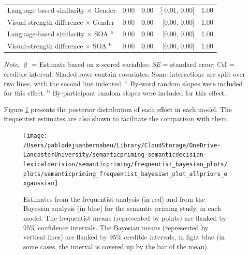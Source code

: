 \documentclass[
  12pt,
  man,floatsintext]{apa7}
\begin{document}
\begin{table}[H]
\begin{threeparttable}
\begin{tabular}[t]{lrrrr}
\hspace{1em}Language-based similarity  $\times$  Gender & 0.00 & 0.00 & {}[-0.01, 0.00] & 1.00\\
\hspace{1em}Visual-strength difference  $\times$  Gender & 0.00 & 0.00 & {}[0.00, 0.00] & 1.00\\
\hspace{1em}Language-based similarity  $\times$  SOA $^{\text{b}}$ & 0.00 & 0.00 & {}[0.00, 0.00] & 1.00\\
\hspace{1em}Visual-strength difference  $\times$  SOA $^{\text{b}}$ & 0.00 & 0.00 & {}[0.00, 0.00] & 1.00\\
\bottomrule
\end{tabular}
\begin{tablenotes}
\item \textit{\linebreak} 
\item \textit{Note}. $\upbeta$ = Estimate based on z-scored variables; \textit{SE} = standard error; \linebreak \phantom{.}CrI = credible interval. Shaded rows contain covariates. Some interactions \linebreak \phantom{.}are split over two lines, with the second line indented. \linebreak \linebreak \phantom{.}$^{\text{a}}$ By-word random slopes were included for this effect. \linebreak \phantom{.}$^{\text{b}}$ By-participant random slopes were included for this effect.
\end{tablenotes}
\end{threeparttable}
\end{table}

Figure \ref{fig:semanticpriming-frequentist-bayesian-plot-allpriors-exgaussian} presents the posterior distribution of each effect in each model. The frequentist estimates are also shown to facilitate the comparison with them.

\begin{figure}

{\centering \texttt{[image: /Users/pablodejuanbernabeu/Library/CloudStorage/OneDrive-LancasterUniversity/semanticpriming-semanticdecision-lexicaldecision/semanticpriming/frequentist\_bayesian\_plots/plots/semanticpriming\_frequentist\_bayesian\_plot\_allpriors\_exgaussian]} 

}

\caption{Estimates from the frequentist analysis (in red) and from the Bayesian analysis (in blue) for the semantic priming study, in each model. The frequentist means (represented by points) are flanked by 95\% confidence intervals. The Bayesian means (represented by vertical lines) are flanked by 95\% credible intervals, in light blue (in some cases, the interval is covered up by the bar of the mean).}\label{fig:semanticpriming-frequentist-bayesian-plot-allpriors-exgaussian}
\end{figure}
\end{document}
